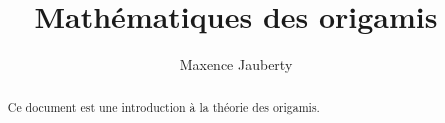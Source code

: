 \documentclass[a4paper]{article}
\begin{document}
\title{Mathématiques des origamis}
\author{Maxence Jauberty}
\maketitle
\begin{abstract}
    Ce document est une introduction à la théorie des origamis.
\end{abstract}
\tableofcontents
\section{}
\end{document}
